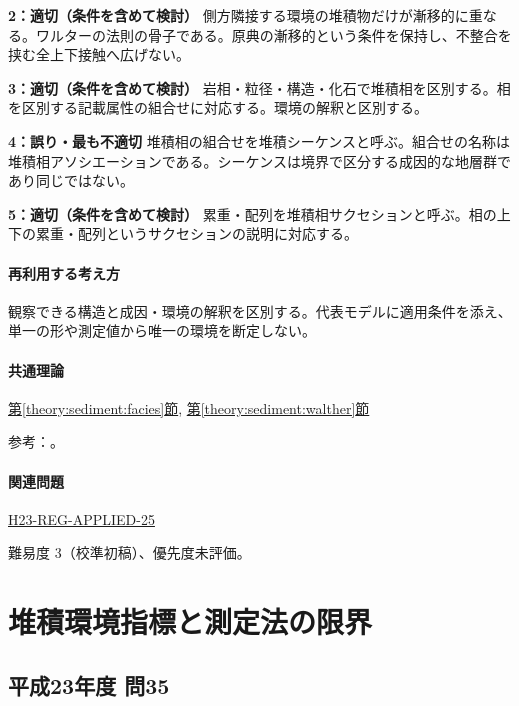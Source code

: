 \noindent\textbf{2：適切（条件を含めて検討）} 側方隣接する環境の堆積物だけが漸移的に重なる。ワルターの法則の骨子である。原典の漸移的という条件を保持し、不整合を挟む全上下接触へ広げない。\par

\noindent\textbf{3：適切（条件を含めて検討）} 岩相・粒径・構造・化石で堆積相を区別する。相を区別する記載属性の組合せに対応する。環境の解釈と区別する。\par

\noindent\textbf{4：誤り・最も不適切} 堆積相の組合せを堆積シーケンスと呼ぶ。組合せの名称は堆積相アソシエーションである。シーケンスは境界で区分する成因的な地層群であり同じではない。\par

\noindent\textbf{5：適切（条件を含めて検討）} 累重・配列を堆積相サクセションと呼ぶ。相の上下の累重・配列というサクセションの説明に対応する。\par

\paragraph{再利用する考え方} 観察できる構造と成因・環境の解釈を区別する。代表モデルに適用条件を添え、単一の形や測定値から唯一の環境を断定しない。

\paragraph{共通理論} \hyperref[theory:sediment:facies]{第\ref*{theory:sediment:facies}節}, \hyperref[theory:sediment:walther]{第\ref*{theory:sediment:walther}節}

\par 参考：\cite{sed_mit_environment,sed_walther_oregon}。

\paragraph{関連問題} \hyperref[q:h23-reg-applied-25]{H23-REG-APPLIED-25}

\par 難易度 3（校準初稿）、優先度未評価。

\section{堆積環境指標と測定法の限界}

\subsection{平成23年度 問35}
\label{q:h23-reg-applied-35}

